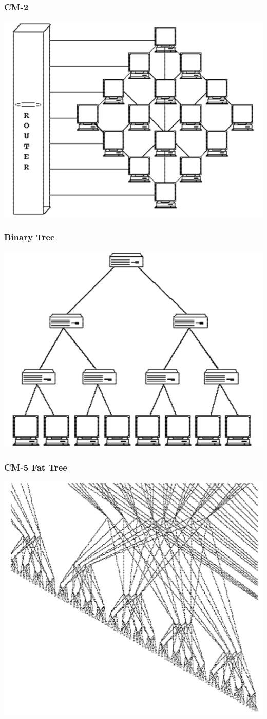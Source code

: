 \documentclass[12pt, a4paper]{book}
\begin{document}
\subsubsection{CM-2}
\includegraphics[width=0.5\linewidth]{figures/CM-2.png}
\subsubsection{Binary Tree}
\includegraphics[width=0.5\linewidth]{figures/Binary Tree.png}
\subsubsection{CM-5 Fat Tree}
\includegraphics[width=0.5\linewidth]{figures/CM-5 Fat Tree.png}
\end{document}
